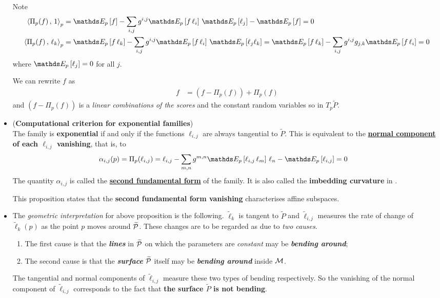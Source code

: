 \documentclass[11pt]{article}
\begin{document}
\begin{itemize}
Note
\begin{align*}
\inn{\Pi_{p}(f)}{1}_{p} &=  \E{p}{f} - \sum_{i,j}g^{i,j}\E{p}{f\,\ell_{i}}\,\E{p}{\ell_{j}} - \E{p}{f} = 0\\
\inn{\Pi_{p}(f)}{\ell_k}_{p} &=  \E{p}{f\,\ell_k} - \sum_{i,j}g^{i,j}\E{p}{f\,\ell_{i}}\,\E{p}{\ell_{j}\ell_k} = \E{p}{f\,\ell_k} - \sum_{i,j}g^{i,j}g_{j,k}\E{p}{f\,\ell_{i}} = 0
\end{align*} where $\E{p}{\ell_{j}} = 0$ for all $j$.

We can rewrite $f$ as
\begin{align*}
f &= (f - \Pi_{p}(f)) + \Pi_{p}(f)
\end{align*} and $ (f - \Pi_{p}(f))$ is a \emph{linear combinations of the scores} and the constant random variables so in $T_{p}\widetilde{P}$.

\item \begin{proposition} (\textbf{Computational criterion for exponential families}) \citep{murray1993differential}\\
The family is \textbf{exponential} if and only if the functions $\ell_{i,j}$ are always tangential to $\widetilde{P}$. This is equivalent to the \textbf{\underline{normal
component} of each $\ell_{i,j}$ vanishing}, that is, to
\begin{align}
\alpha_{i,j}(p) = \Pi_{p}(\ell_{i,j})&=   \ell_{i,j} - \sum_{m,n}g^{m,n}\E{p}{\ell_{i,j}\,\ell_{m}}\,\ell_{n} - \E{p}{\ell_{i,j}}  = 0 \label{eqn: 2nd_fundamental_form} 
\end{align} The quantity $\alpha_{i,j}$ is called the \underline{\textbf{second fundamental form}} of the family. It is also called the \textbf{imbedding curvature} in \citep{amari2007methods}.
 \end{proposition}
 
This proposition states that the \textbf{second fundamental form vanishing} characterises affine subspaces.
 
 \item The \emph{geometric interpretation} for above proposition is the following. $\widetilde{\ell}_{k}$ is tangent to $\widetilde{P}$ and $\widetilde{\ell}_{i,j}$ measures the rate of change of $\widetilde{\ell}_{k}(p)$ as the point $p$ moves around $\widetilde{{\mathcal P}}$. These changes are to be regarded as due to \emph{two causes}.
\begin{enumerate}
\item The first cause is that the \emph{\textbf{lines}} in $\widetilde{{\mathcal P}}$ on which the parameters are \emph{constant} may be \textbf{\emph{bending around}};
\item The second cause is that the \textbf{\emph{surface}} $\widetilde{{\mathcal P}}$ itself may be \emph{\textbf{bending around}} inside ${\mathcal M}$.
\end{enumerate}  The tangential and normal components of $\widetilde{\ell}_{i,j}$ measure these two types of bending respectively. So the vanishing
of the normal component of $\widetilde{\ell}_{i,j}$ corresponds to the fact that \textbf{the surface $\widetilde{P}$ is not bending}.


\end{itemize}
\end{document}
